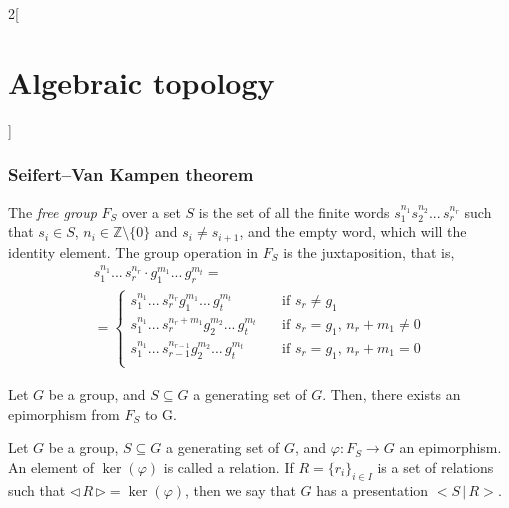 \documentclass[../../../main_math.tex]{subfiles}
\begin{document}
\begin{multicols}{2}[\section{Algebraic topology}]
  \subsubsection{Seifert–Van Kampen theorem}
  \begin{definition}
    The \emph{free group} $F_S$ over a set $S$ is the set of all the finite words $s_1^{n_1}s_2^{n_2}...\,s_r^{n_r}$ such that $s_i \in S$, $n_i \in \mathbb{Z}\setminus\{0\}$ and $s_i \neq s_{i+1}$, and the empty word, which will the identity element. The group operation in $F_S$ is the juxtaposition, that is,
    \begin{multline*}
      s_1^{n_1}...\,s_r^{n_r} \cdot g_1^{m_1}...\,g_r^{m_t}=\\
      = \begin{cases}
        s_1^{n_1}...\,s_r^{n_r}g_1^{m_1}...\,g_t^{m_t}         & \quad\text{if  } s_r\neq g_1                      \\
        s_1^{n_1}...\,s_r^{n_r+m_1}g_2^{m_2}...\,g_t^{m_t}     & \quad\text{if }s_r = g_1 \text{, } n_r+m_1 \neq 0 \\
        s_1^{n_1}...\,s_{r-1}^{n_{r-1}}g_2^{m_2}...\,g_t^{m_t} & \quad\text{if }s_r = g_1 \text{, } n_r+m_1 = 0    \\
      \end{cases}
    \end{multline*}

  \end{definition}


  \begin{proposition}
    Let $G$ be a group, and $S\subseteq G$ a generating set of $G$. Then, there exists an epimorphism from $F_S$ to G.
  \end{proposition}

  \begin{definition}
    Let $G$ be a group, $S\subseteq G$ a generating set of $G$, and $\varphi:F_S\to G$ an epimorphism. An element of $\ker(\varphi)$ is called a relation. If $R=\{r_i\}_{i\in I}$ is a set of relations such that $\triangleleft \, R \, \triangleright = \ker(\varphi)$, then we say that $G$ has a presentation $< S \, | \, R >$.
  \end{definition}


\end{multicols}
\end{document}
